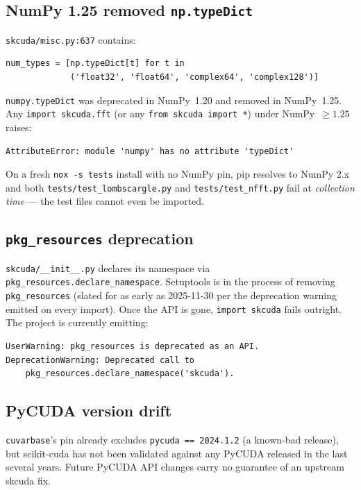 \documentclass[11pt,a4paper]{article}
\begin{document}
\subsection{NumPy 1.25 removed \texttt{np.typeDict}}
\label{sec:typedict}
\texttt{skcuda/misc.py:637} contains:

\begin{lstlisting}[language=pyplus]
num_types = [np.typeDict[t] for t in
             ('float32', 'float64', 'complex64', 'complex128')]
\end{lstlisting}

\noindent
\texttt{numpy.typeDict} was deprecated in NumPy~1.20 and removed in
NumPy~1.25. Any \texttt{import skcuda.fft} (or any \texttt{from skcuda import
*}) under NumPy~$\geq 1.25$ raises:

\begin{lstlisting}[basicstyle=\ttfamily\small]
AttributeError: module 'numpy' has no attribute 'typeDict'
\end{lstlisting}

\noindent
On a fresh \texttt{nox -s tests} install with no NumPy pin, pip resolves to
NumPy 2.x and both \texttt{tests/test\_lombscargle.py} and
\texttt{tests/test\_nfft.py} fail at \emph{collection time} --- the test files
cannot even be imported.

\subsection{\texttt{pkg\_resources} deprecation}
\texttt{skcuda/\_\_init\_\_.py} declares its namespace via
\texttt{pkg\_resources.declare\_namespace}. Setuptools is in the process of
removing \texttt{pkg\_resources} (slated for as early as 2025-11-30 per the
deprecation warning emitted on every import). Once the API is gone,
\texttt{import skcuda} fails outright. The project is currently emitting:

\begin{lstlisting}[basicstyle=\ttfamily\small]
UserWarning: pkg_resources is deprecated as an API.
DeprecationWarning: Deprecated call to
    pkg_resources.declare_namespace('skcuda').
\end{lstlisting}

\subsection{PyCUDA version drift}
\texttt{cuvarbase}'s pin already excludes \texttt{pycuda~==~2024.1.2} (a
known-bad release), but scikit-cuda has not been validated against any PyCUDA
released in the last several years. Future PyCUDA API changes carry no
guarantee of an upstream skcuda fix.
\end{document}
